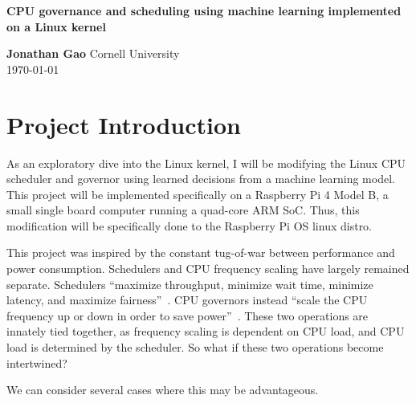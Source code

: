 \documentclass[12pt]{article}
\author{Jonathan Gao}
\def\ind{\hspace*{0.3in}}
\begin{document}
\begin{titlepage}
   \begin{center}
       \vspace*{5cm}
       {\huge\textbf{CPU governance and scheduling using machine learning implemented on a Linux kernel}}
       \vspace{1.5cm}
       
       \textbf{Jonathan Gao}
       \vfill
       \vspace{0.8cm}
       Cornell University\\
       \today
            
   \end{center}
\end{titlepage}

\section*{Project Introduction}
\ind As an exploratory dive into the Linux kernel, I will be modifying the Linux CPU scheduler and governor using learned decisions from a machine learning model. This project will be implemented specifically on a Raspberry Pi 4 Model B, a small single board computer running a quad-core ARM SoC. Thus, this modification will be specifically done to the Raspberry Pi OS linux distro.

This project was inspired by the constant tug-of-war between performance and power consumption. Schedulers and CPU frequency scaling have largely remained separate. Schedulers ``maximize throughput, minimize wait time, minimize latency, and maximize fairness''~\cite{SchedulingComputing2020}. CPU governors instead ``scale the CPU frequency up or down in order to save power''~\cite{CPUFrequencyScaling}. These two operations are innately tied together, as frequency scaling is dependent on CPU load, and CPU load is determined by the scheduler. So what if these two operations become intertwined?

\vspace{3mm}
We can consider several cases where this may be advantageous. 
\end{document}
